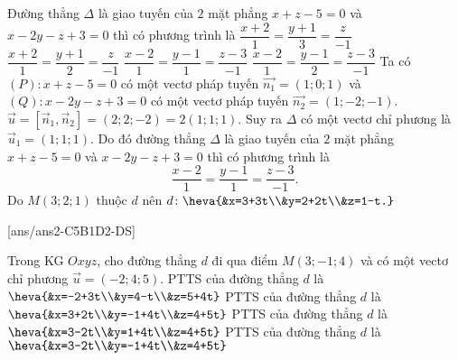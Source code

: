 \begin{ex}%
	Đường thẳng $\Delta$ là giao tuyến của $2$ mặt phẳng $x+z-5=0$ và $x-2y-z+3=0$ thì có phương trình là
	\choice
	{$\dfrac{x+2}{1}=\dfrac{y+1}{3}=\dfrac{z}{-1}$}
	{$\dfrac{x+2}{1}=\dfrac{y+1}{2}=\dfrac{z}{-1}$}
	{\True $\dfrac{x-2}{1}=\dfrac{y-1}{1}=\dfrac{z-3}{-1}$}
	{$\dfrac{x-2}{1}=\dfrac{y-1}{2}=\dfrac{z-3}{-1}$}
	\loigiai
	{
		Ta có $(P)\colon x+z-5=0$ có một vectơ pháp tuyến $\overrightarrow{n_{1}}=(1;0;1)$ và $(Q)\colon x-2y-z+3=0$ có một vectơ pháp tuyến $\overrightarrow{n_{2}}=(1;-2;-1)$.\\
		$\vec{u}=\left[\overrightarrow{n}_{1},\overrightarrow{n}_{2}\right]=(2;2;-2)=2(1;1;1)$.
		Suy ra $\Delta$ có một vectơ chỉ phương là $\vec{u}_{1}=(1;1;1)$.
		Do đó đường thẳng $\Delta$ là giao tuyến của $2$ mặt phẳng $x+z-5=0$ và $x-2y-z+3=0$ thì có phương trình là 
		$$\dfrac{x-2}{1}=\dfrac{y-1}{1}=\dfrac{z-3}{-1}.$$
		Do $M(3;2;1)$ thuộc $d$ nên $d\colon\heva{&x=3+3t\\&y=2+2t\\&z=1-t.}$
	}
\end{ex}
\TNTF
{}[ans/ans2-C5B1D2-DS]
\setcounter{ex}{13}%
\begin{ex}%
	Trong KG $Oxyz$, cho đường thẳng $d$ đi qua điểm $M(3;-1;4)$ và có một vectơ chỉ phương $\vec{u}=(-2;4;5)$. 
	\choiceTF
	{PTTS của đường thẳng $d$ là $\heva{&x=-2+3t\\&y=4-t\\&z=5+4t}$}
	{PTTS của đường thẳng $d$ là $\heva{&x=3+2t\\&y=-1+4t\\&z=4+5t}$}
	{PTTS của đường thẳng $d$ là $\heva{&x=3-2t\\&y=1+4t\\&z=4+5t}$}
	{\True PTTS của đường thẳng $d$ là $\heva{&x=3-2t\\&y=-1+4t\\&z=4+5t}$}
\end{ex}
